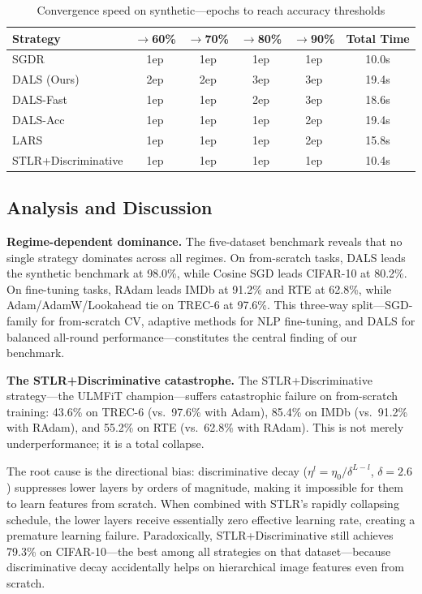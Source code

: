 \documentclass[a4paper,fleqn]{cas-dc}
\begin{document}
\begin{table}[width=\columnwidth,cols=5,pos=h]
\caption{Convergence speed on synthetic---epochs to reach accuracy thresholds}\label{tab:convergence}
\footnotesize
\begin{tabular*}{\tblwidth}{@{} L C C C C C @{}}
\toprule
Strategy & $\to$60\% & $\to$70\% & $\to$80\% & $\to$90\% & Total Time \\
\midrule
SGDR & 1ep & 1ep & 1ep & 1ep & 10.0s \\
DALS (Ours) & 2ep & 2ep & 3ep & 3ep & 19.4s \\
DALS-Fast & 1ep & 1ep & 2ep & 3ep & 18.6s \\
DALS-Acc & 1ep & 1ep & 1ep & 2ep & 19.4s \\
LARS & 1ep & 1ep & 1ep & 2ep & 15.8s \\
STLR+Discriminative & 1ep & 1ep & 1ep & 1ep & 10.4s \\
\bottomrule
\end{tabular*}
\end{table}

\subsection{Analysis and Discussion}\label{sec:analysis}

\textbf{Regime-dependent dominance.} The five-dataset benchmark reveals that no single strategy dominates across all regimes. On from-scratch tasks, DALS leads the synthetic benchmark at 98.0\%, while Cosine SGD leads CIFAR-10 at 80.2\%. On fine-tuning tasks, RAdam leads IMDb at 91.2\% and RTE at 62.8\%, while Adam/AdamW/Lookahead tie on TREC-6 at 97.6\%. This three-way split---SGD-family for from-scratch CV, adaptive methods for NLP fine-tuning, and DALS for balanced all-round performance---constitutes the central finding of our benchmark.

{\sloppy \textbf{The STLR+Discriminative catastrophe.} The STLR+Discriminative strategy---the ULMFiT champion---suffers catastrophic failure on from-scratch training: 43.6\% on TREC-6 (vs.\ 97.6\% with Adam), 85.4\% on IMDb (vs.\ 91.2\% with RAdam), and 55.2\% on RTE (vs.\ 62.8\% with RAdam). This is not merely underperformance; it is a total collapse.

The root cause is the directional bias: discriminative decay ($\eta^l = \eta_0 / \delta^{L-l}$, $\delta=2.6$) suppresses lower layers by orders of magnitude, making it impossible for them to learn features from scratch. When combined with STLR's rapidly collapsing schedule, the lower layers receive essentially zero effective learning rate, creating a premature learning failure. Paradoxically, STLR+Discriminative still achieves 79.3\% on CIFAR-10---the best among all strategies on that dataset---because discriminative decay accidentally helps on hierarchical image features even from scratch.\par}
\end{document}
